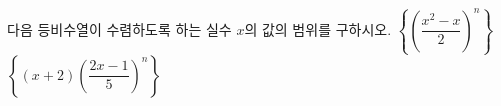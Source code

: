 다음 등비수열이 수렴하도록 하는 실수 $x$의 값의 범위를 구하시오.
 $\left\{\left(\dfrac{x^2-x}{2}\right)^n\right\}$
 $\left\{(x+2)\left(\dfrac{2x-1}{5}\right)^n\right\}$
